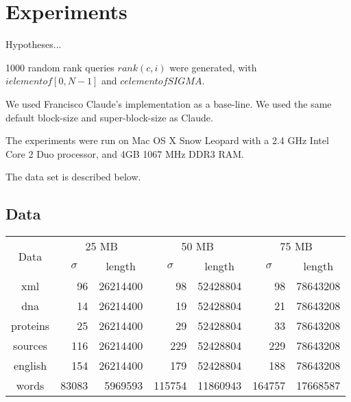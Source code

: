 \section{Experiments}

Hypotheses...

1000 random rank queries $rank(c, i)$ were generated, with $i elementof [0, N-1]$ and $c elementof SIGMA$.

We used Francisco Claude's
implementation as a base-line. We used the same default block-size and
super-block-size as Claude.

The experiments were run on Mac OS X Snow Leopard with a 2.4 GHz Intel Core 2
Duo processor, and 4GB 1067 MHz DDR3 RAM.

The data set is described below.

\subsection{Data}

\begin{center}
\begin{tabular}{crrrrrr}
\toprule
\multirow{2}{*}{Data} & \multicolumn{2}{c}{25 MB} & \multicolumn{2}{c}{50 MB} &  
	\multicolumn{2}{c}{75 MB}\\
		  \cmidrule(r){2-7}
	      &\multicolumn{1}{c}{$\sigma$}& \multicolumn{1}{c}{length}
		  &\multicolumn{1}{c}{$\sigma$}&\multicolumn{1}{c}{length}
		  &\multicolumn{1}{c}{$\sigma$}&\multicolumn{1}{c}{length}\\
\midrule
xml 	  & 96	   & 26214400 & 98 	   & 52428804 & 98 	   & 78643208 \\
dna 	  & 14     & 26214400 & 19 	   & 52428804 & 21     & 78643208 \\
proteins  & 25     & 26214400 & 29     & 52428804 & 33     & 78643208 \\
sources   & 116    & 26214400 & 229    & 52428804 & 229    & 78643208 \\
english   & 154    & 26214400 & 179    & 52428804 & 188    & 78643208 \\
words     & 83083  & 5969593  & 115754 & 11860943 & 164757 & 17668587 \\
\bottomrule
\end{tabular}
\end{center}

